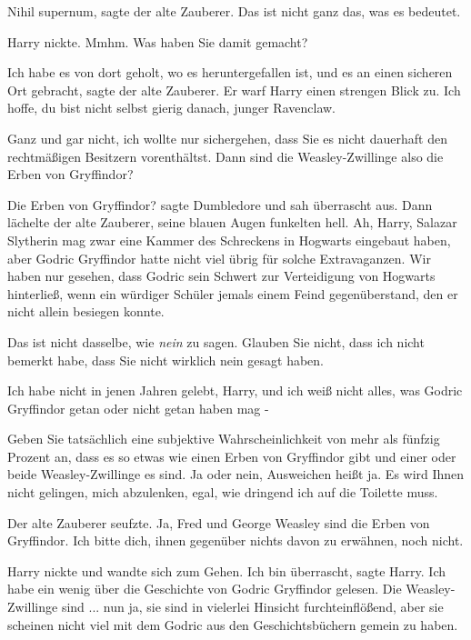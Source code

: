 \glqq{}Nihil supernum\grqq{}, sagte der alte Zauberer. \glqq{}Das ist nicht ganz
das, was es bedeutet.\grqq{}

Harry nickte. \glqq{}Mmhm. Was haben Sie damit gemacht?\grqq{}

\glqq{}Ich habe es von dort geholt, wo es heruntergefallen ist, und es an einen
sicheren Ort gebracht\grqq{}, sagte der alte Zauberer. Er warf Harry einen
strengen Blick zu. \glqq{}Ich hoffe, du bist nicht selbst gierig danach, junger
Ravenclaw.\grqq{}

\glqq{}Ganz und gar nicht, ich wollte nur sichergehen, dass Sie es nicht
dauerhaft den rechtmäßigen Besitzern vorenthältst. Dann sind die
Weasley-Zwillinge also die Erben von Gryffindor?\grqq{}

\glqq{}Die Erben von Gryffindor?\grqq{} sagte Dumbledore und sah überrascht aus.
Dann lächelte der alte Zauberer, seine blauen Augen funkelten hell. \glqq{}Ah,
Harry, Salazar Slytherin mag zwar eine Kammer des Schreckens in Hogwarts
eingebaut haben, aber Godric Gryffindor hatte nicht viel übrig für solche
Extravaganzen. Wir haben nur gesehen, dass Godric sein Schwert zur Verteidigung
von Hogwarts hinterließ, wenn ein würdiger Schüler jemals einem Feind
gegenüberstand, den er nicht allein besiegen konnte.\grqq{}

\glqq{}Das ist nicht dasselbe, wie \emph{nein} zu sagen. Glauben Sie nicht, dass
ich nicht bemerkt habe, dass Sie nicht wirklich nein gesagt haben.\grqq{}

\glqq{}Ich habe nicht in jenen Jahren gelebt, Harry, und ich weiß nicht alles,
was Godric Gryffindor getan oder nicht getan haben mag -\grqq{}

\glqq{}Geben Sie tatsächlich eine subjektive Wahrscheinlichkeit von mehr als
fünfzig Prozent an, dass es so etwas wie einen Erben von Gryffindor gibt und
einer oder beide Weasley-Zwillinge es sind. Ja oder nein, Ausweichen heißt ja.
Es wird Ihnen nicht gelingen, mich abzulenken, egal, wie dringend ich auf die
Toilette muss.\grqq{}

Der alte Zauberer seufzte. \glqq{}Ja, Fred und George Weasley sind die Erben von
Gryffindor. Ich bitte dich, ihnen gegenüber nichts davon zu erwähnen, noch
nicht.\grqq{}

Harry nickte und wandte sich zum Gehen. \glqq{}Ich bin überrascht\grqq{}, sagte
Harry. \glqq{}Ich habe ein wenig über die Geschichte von Godric Gryffindor
gelesen. Die Weasley-Zwillinge sind ... nun ja, sie sind in vielerlei Hinsicht
furchteinflößend, aber sie scheinen nicht viel mit dem Godric aus den
Geschichtsbüchern gemein zu haben.\grqq{}

